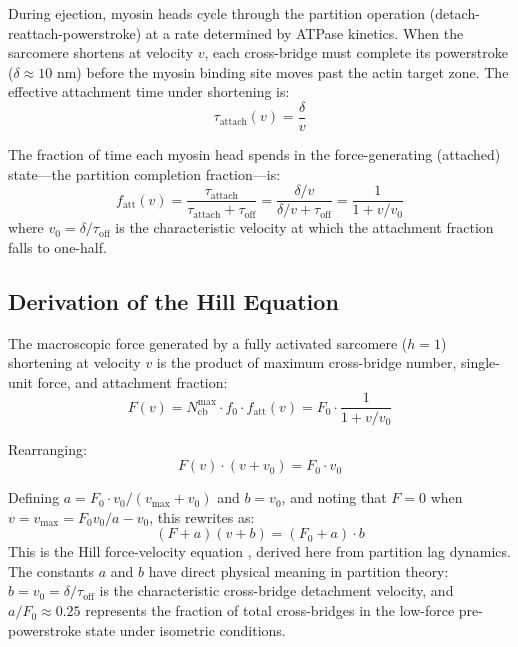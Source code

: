 \documentclass[10pt,twocolumn,a4paper]{article}
\theoremstyle{remark}
\newcommand{\Ncb}{N_{\mathrm{cb}}}
\begin{document}
During ejection, myosin heads cycle through the partition operation (detach-reattach-powerstroke) at a rate determined by ATPase kinetics. When the sarcomere shortens at velocity $v$, each cross-bridge must complete its powerstroke ($\delta \approx 10$ nm) before the myosin binding site moves past the actin target zone. The effective attachment time under shortening is:
\begin{equation}
    \tau_{\mathrm{attach}}(v) = \frac{\delta}{v}
    \label{eq:tau_attach}
\end{equation}

The fraction of time each myosin head spends in the force-generating (attached) state—the partition completion fraction—is:
\begin{equation}
    f_{\mathrm{att}}(v) = \frac{\tau_{\mathrm{attach}}}{\tau_{\mathrm{attach}} + \tau_{\mathrm{off}}} = \frac{\delta/v}{\delta/v + \tau_{\mathrm{off}}} = \frac{1}{1 + v/v_0}
    \label{eq:f_att}
\end{equation}
where $v_0 = \delta/\tau_{\mathrm{off}}$ is the characteristic velocity at which the attachment fraction falls to one-half.

\subsection{Derivation of the Hill Equation}

The macroscopic force generated by a fully activated sarcomere ($h = 1$) shortening at velocity $v$ is the product of maximum cross-bridge number, single-unit force, and attachment fraction:
\begin{equation}
    F(v) = \Ncb^{\max} \cdot f_0 \cdot f_{\mathrm{att}}(v) = F_0 \cdot \frac{1}{1 + v/v_0}
\end{equation}

Rearranging:
\begin{equation}
    F(v) \cdot (v + v_0) = F_0 \cdot v_0
\end{equation}

Defining $a = F_0 \cdot v_0 / (v_{\max} + v_0)$ and $b = v_0$, and noting that $F = 0$ when $v = v_{\max} = F_0 v_0/a - v_0$, this rewrites as:
\begin{equation}
    \boxed{(F + a)(v + b) = (F_0 + a) \cdot b}
    \label{eq:hill}
\end{equation}
This is the Hill force-velocity equation \cite{hill1938heat}, derived here from partition lag dynamics. The constants $a$ and $b$ have direct physical meaning in partition theory: $b = v_0 = \delta/\tau_{\mathrm{off}}$ is the characteristic cross-bridge detachment velocity, and $a/F_0 \approx 0.25$ represents the fraction of total cross-bridges in the low-force pre-powerstroke state under isometric conditions.
\end{document}
